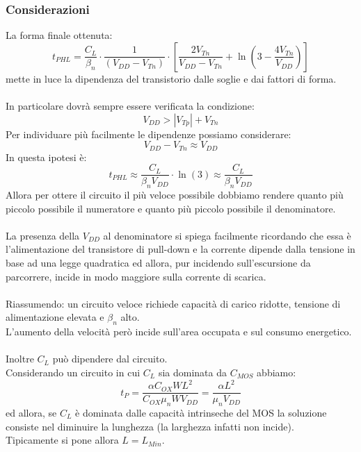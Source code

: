 \documentclass[../main.tex]{subfiles}
\begin{document}
	\subsubsection{Considerazioni}
	La forma finale ottenuta:
	$$t_{PHL} = \frac{C_L}{\beta_n} \cdot \frac{1}{(V_{DD} - V_{Tn})} \cdot \left[ \frac{2V_{Tn}}{V_{DD} - V_{Tn}} + \ln \left( 3 - \frac{4V_{Tn}}{V_{DD}} \right) \right]$$
	mette in luce la dipendenza del transistorio dalle soglie e dai fattori di forma.\\\\
	In particolare dovrà sempre essere verificata la condizione:
	$$V_{DD} > |V_{Tp}| + V_{Tn}$$
	Per individuare più facilmente le dipendenze possiamo considerare:
	$$V_{DD} - V_{Tn} \approx V_{DD}$$
	In questa ipotesi è:
	$$t_{PHL} \approx \frac{C_L}{\beta_n V_{DD}} \cdot \ln(3) \approx \frac{C_L}{\beta_n V_{DD}}$$
	Allora per ottere il circuito il più veloce possibile dobbiamo rendere quanto più piccolo possibile il numeratore e quanto più piccolo possibile il denominatore.\\\\
	La presenza della $V_{DD}$ al denominatore si spiega facilmente ricordando che essa è l'alimentazione del transistore di pull-down e la corrente dipende dalla tensione in base ad una legge quadratica ed allora, pur incidendo sull'escursione da parcorrere, incide in modo maggiore sulla corrente di scarica.\\\\
	Riassumendo: un circuito veloce richiede capacità di carico ridotte, tensione di alimentazione elevata e $\beta_n$ alto.\\
	L'aumento della velocità però incide sull'area occupata e sul consumo energetico.\\\\
	Inoltre $C_L$ può dipendere dal circuito.\\
	Considerando un circuito in cui $C_L$ sia dominata da $C_{MOS}$ abbiamo:
	$$t_P = \frac{\alpha C_{OX} W L^2}{C_{OX} \mu_n W V_{DD}} = \frac{\alpha L^2}{\mu_n V_{DD}}$$
	ed allora, se $C_L$ è dominata dalle capacità intrinseche del MOS la soluzione consiste nel diminuire la lunghezza (la larghezza infatti non incide).\\
	Tipicamente si pone allora $L = L_{Min}$.
\end{document}

